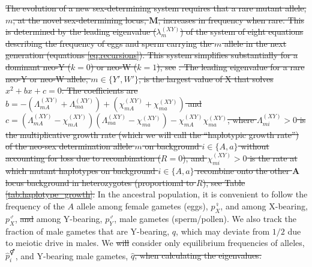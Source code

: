 \documentclass[10pt,letterpaper]{article}
\providecommand{\DIFadd}[1]{{\protect\color{blue}\uwave{#1}}} %
\providecommand{\DIFdel}[1]{{\protect\color{red}\sout{#1}}}                      %
\providecommand{\DIFaddbegin}{} %
\providecommand{\DIFaddend}{} %
\providecommand{\DIFdelbegin}{} %
\providecommand{\DIFdelend}{} %
\begin{document}
\DIFdel{The evolution of a new sex-determining system requires that a rare mutant allele, $m$, at the novel sex-determining locus, $\mathbf{M}$, increases in frequency when rare. 
This is determined by the leading eigenvalue ($\lambda_m^{(XY)}$) of the system of eight equations describing the frequency of eggs and sperm carrying the $m$ allele in the next generation (equations \ref{eq:recursions}). %
This system simplifies substantially for a dominant neo-Y ($k=0$) or neo-W ($k=1$), see }%
\DIFdel{. 
The leading eigenvalue for a rare neo-Y or neo-W allele, $m\in\{Y',W'\}$, is the largest value of X that solves $x^2+ b x + c = 0$.  %
The coefficients are $b= - (\Lambda_{mA}^{(XY)} + \Lambda_{ma}^{(XY)})+(\chi_{mA}^{(XY)} + \chi_{ma}^{(XY)})$ and $c = (\Lambda_{mA}^{(XY)} - \chi_{mA}^{(XY)}) (\Lambda_{ma}^{(XY)} - \chi_{ma}^{(XY)}) - \chi_{mA}^{(XY)} \chi_{ma}^{(XY)}$, where $\Lambda_{mi}^{(XY)}>0$ is the multiplicative growth rate (which we will call the ``haplotypic growth rate'') of the neo-sex determination allele $m$ on background $i\in\{A,a\}$ without accounting for loss due to recombination ($R=0$), and $\chi_{mi}^{(XY)}>0$ is the rate at which mutant haplotypes on background $i\in\{A,a\}$ recombine onto the other $\mathbf{A}$ locus background in heterozygotes (proportional to $R$), see Table \ref{tab:haplotype_growth}.
}\DIFdelend In the ancestral population, it is convenient to follow the frequency of the $A$ allele among female gametes (eggs), $p^\female_X$, and among X-bearing, $p^\male_X$, \DIFdelbegin \DIFdel{and }\DIFdelend \DIFaddbegin \DIFadd{or }\DIFaddend among Y-bearing, $p^\male_Y$, male gametes (sperm/pollen). 
We also track the fraction of male gametes that are Y-bearing, $q$, which may deviate from $1/2$ due to meiotic drive in males. 
We \DIFdelbegin \DIFdel{will }\DIFdelend consider only equilibrium frequencies of alleles, \DIFdelbegin \DIFdel{$\hat{p}^\Hermaphrodite_i$}\DIFdelend \DIFaddbegin \DIFadd{$\hat{p}^\circ_i$}\DIFaddend , and Y-bearing male gametes, \DIFdelbegin \DIFdel{$\hat{q}$, when calculating the eigenvalues.  
}%
\end{document}
